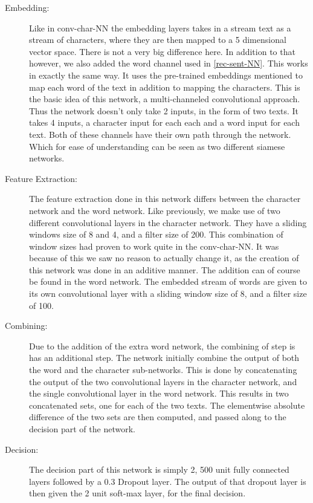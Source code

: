 \begin{description}

    \item[Embedding:]

    Like in \gls{conv-char-NN} the embedding layers takes in a stream text as a
    stream of characters, where they are then mapped to a 5 dimensional vector
    space. There is not a very big difference here. In addition to that however,
    we also added the word channel used in \ref{rec-sent-NN}. This works in
    exactly the same way. It uses the pre-trained embeddings mentioned to map
    each word of the text in addition to mapping the characters. This is the
    basic idea of this network, a multi-channeled convolutional approach. Thus
    the network doesn't only take 2 inputs, in the form of two texts. It takes 4
    inputs, a character input for each each and a word input for each text. Both
    of these channels have their own path through the network. Which for ease of
    understanding can be seen as two different siamese networks.

    \item[Feature Extraction:]

    The feature extraction done in this network differs between the character
    network and the word network. Like previously, we make use of two different
    convolutional layers in the character network. They have a sliding windows
    size of 8 and 4, and a filter size of 200. This combination of window sizes
    had proven to work quite in the \gls{conv-char-NN}. It was because of this
    we saw no reason to actually change it, as the creation of this network was
    done in an additive manner. The addition can of course be found in the word
    network. The embedded stream of words are given to its own convolutional
    layer with a sliding window size of 8, and a filter size of 100.

    \item[Combining:]

    Due to the addition of the extra word network, the combining of step is
    has an additional step. The network initially combine the output of both
    the word and the character sub-networks. This is done by concatenating
    the output of the two convolutional layers in the character network, and
    the single convolutional layer in the word network. This results in two
    concatenated sets, one for each of the two texts. The elementwise absolute
    difference of the two sets are then computed, and passed along to the
    decision part of the network.

    \item[Decision:]

    The decision part of this network is simply 2, 500 unit fully connected
    layers followed by a 0.3 Dropout layer. The output of that dropout layer
    is then given the 2 unit soft-max layer, for the final decision.


\end{description}
    




